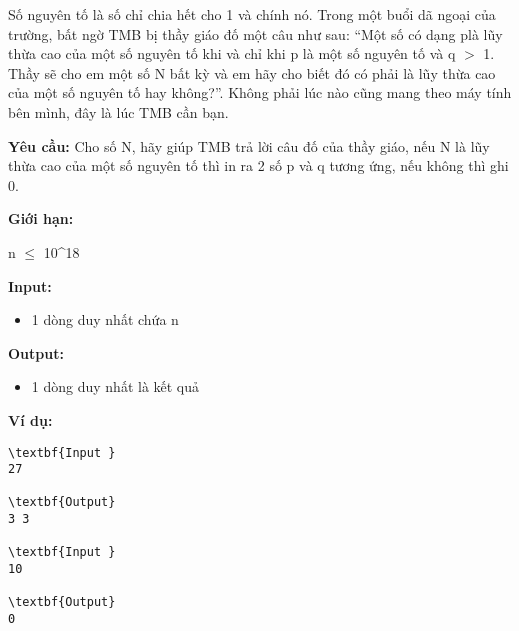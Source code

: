 

Số nguyên tố là số chỉ chia hết cho 1 và chính nó. Trong một buổi dã ngoại của trường, bất ngờ TMB bị thầy giáo đố một câu như sau: “Một số có dạng p\textasciicircumq là lũy thừa cao của một số nguyên tố khi và chỉ khi p là một số nguyên tố và q $>$ 1. Thầy sẽ cho em một số N bất kỳ và em hãy cho biết đó có phải là lũy thừa cao của một số nguyên tố hay không?”. Không phải lúc nào cũng mang theo máy tính bên mình, đây là lúc TMB cần bạn.

\textbf{Yêu cầu: } Cho số N, hãy giúp TMB trả lời câu đố của thầy giáo, nếu N là lũy thừa cao của một số nguyên tố thì in ra 2 số p và q tương ứng, nếu không thì ghi 0.

\textbf{Giới hạn: }

n  $\le$  10\textasciicircum18

\textbf{Input: }
\begin{itemize}
	\item 

1 dòng duy nhất chứa n
\end{itemize}

\textbf{Output: }
\begin{itemize}
	\item 

1 dòng duy nhất là kết quả
\end{itemize}

\textbf{Ví dụ: }
\begin{verbatim}
\textbf{Input }
27

\textbf{Output}
3 3

\textbf{Input }
10

\textbf{Output}
0\end{verbatim}
